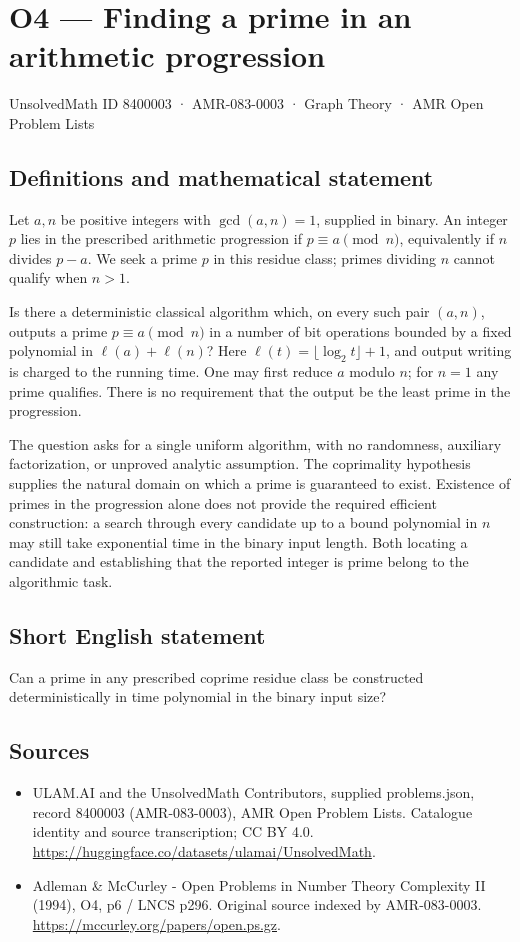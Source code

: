 \documentclass[11pt,a4paper]{article}
\begin{document}
\section*{O4 — Finding a prime in an arithmetic progression}\label{8400003}
{\small UnsolvedMath ID 8400003 · AMR-083-0003 · Graph Theory · AMR Open Problem Lists}
\subsection{Definitions and mathematical statement}
Let $a,n$ be positive integers with $\gcd(a,n)=1$, supplied in binary. An integer $p$ lies in the prescribed arithmetic progression if $p\equiv a\pmod n$, equivalently if $n$ divides $p-a$. We seek a prime $p$ in this residue class; primes dividing $n$ cannot qualify when $n>1$.

Is there a deterministic classical algorithm which, on every such pair $(a,n)$, outputs a prime $p\equiv a\pmod n$ in a number of bit operations bounded by a fixed polynomial in $\ell(a)+\ell(n)$? Here $\ell(t)=\lfloor\log_2t\rfloor+1$, and output writing is charged to the running time. One may first reduce $a$ modulo $n$; for $n=1$ any prime qualifies. There is no requirement that the output be the least prime in the progression.

The question asks for a single uniform algorithm, with no randomness, auxiliary factorization, or unproved analytic assumption. The coprimality hypothesis supplies the natural domain on which a prime is guaranteed to exist. Existence of primes in the progression alone does not provide the required efficient construction: a search through every candidate up to a bound polynomial in $n$ may still take exponential time in the binary input length. Both locating a candidate and establishing that the reported integer is prime belong to the algorithmic task.
\subsection{Short English statement}
Can a prime in any prescribed coprime residue class be constructed deterministically in time polynomial in the binary input size?
\subsection{Sources}
\begin{itemize}
\item[S1] ULAM.AI and the UnsolvedMath Contributors, supplied problems.json, record 8400003 (AMR-083-0003), AMR Open Problem Lists. Catalogue identity and source transcription; CC BY 4.0.
\url{https://huggingface.co/datasets/ulamai/UnsolvedMath}.
\item[S2] Adleman \& McCurley - Open Problems in Number Theory Complexity II (1994), O4, p6 / LNCS p296. Original source indexed by AMR-083-0003.
\url{https://mccurley.org/papers/open.ps.gz}.
\end{itemize}
\end{document}

